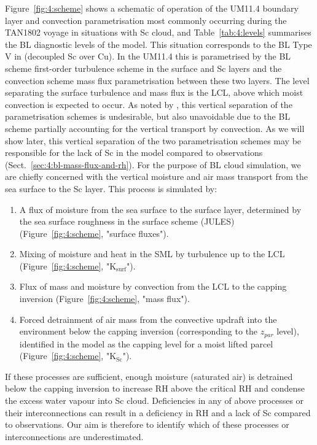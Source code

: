 Figure~\ref{fig:4:scheme} shows a schematic of operation of the UM11.4 boundary layer and convection
parametrisation most
commonly occurring during the TAN1802 voyage in situations with Sc cloud,
and Table~\ref{tab:4:levels} summarises the BL diagnostic levels of the model.
This situation corresponds to the BL Type V in \cite{lock2000} (decoupled Sc over Cu).
In the UM11.4 this is parametrised by the BL scheme first-order turbulence scheme
in the surface and Sc layers and the convection scheme mass flux parametrisation
between these two layers. The level separating the surface turbulence and
mass flux is the LCL, above which moist convection is expected to occur.
As noted by \cite{lock2000}, this vertical separation of the parametrisation
schemes is undesirable, but also unavoidable due to the BL scheme partially
accounting for the vertical transport by convection. As we will show later,
this vertical separation of the two parametrisation schemes may be responsible for the
lack of Sc in the model compared to observations (Sect.~\ref{sec:4:bl-mass-flux-and-rh}). For the purpose of BL
cloud simulation, we are chiefly concerned with the vertical moisture and air
mass transport from the sea surface to the Sc layer. This process is simulated
by:

\begin{enumerate}
\item A flux of moisture from the sea surface to the surface layer, determined
by the sea surface roughness in the surface scheme (JULES) (Figure~\ref{fig:4:scheme}, "surface fluxes").
\item Mixing of moisture and heat in the SML by turbulence up to the LCL (Figure~\ref{fig:4:scheme}, "$\mathrm{K}_\mathrm{surf}$").
\item Flux of mass and moisture by convection from the LCL to the capping inversion (Figure~\ref{fig:4:scheme}, "mass flux").
\item Forced detrainment of air mass from the convective updraft into the environment
below the capping inversion (corresponding to the $z_{par}$ level),
identified in the model as the capping level for a moist lifted parcel (Figure~\ref{fig:4:scheme}, "$\mathrm{K}_\mathrm{Sc}$").
\end{enumerate}

If these processes are sufficient, enough moisture (saturated air) is detrained
below the capping inversion to increase RH above the critical RH and condense the
excess water vapour into Sc cloud. Deficiencies in any of above processes or their interconnections can result in a deficiency in RH and a lack of Sc compared to observations. Our aim is therefore to identify which of these processes or interconnections are underestimated.

